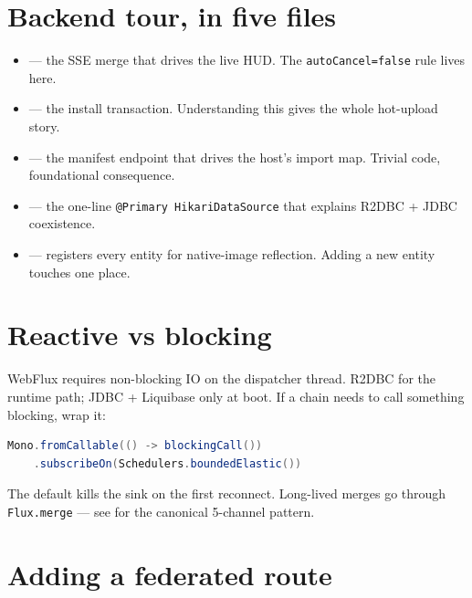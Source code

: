 \documentclass[11pt,a4paper,openany]{book}
\begin{document}
\chapter{Backend tour, in five files}
\begin{itemize}
  \item {} --- the SSE merge that drives
        the live HUD. The \texttt{autoCancel=false} rule lives here.
  \item {} --- the install transaction.
        Understanding this gives the whole hot-upload story.
  \item {} --- the manifest endpoint that
        drives the host's import map. Trivial code, foundational
        consequence.
  \item {} --- the one-line
        \texttt{@Primary HikariDataSource} that explains R2DBC + JDBC
        coexistence.
  \item {} --- registers every entity for
        native-image reflection. Adding a new entity touches one place.
\end{itemize}

\chapter{Reactive vs blocking}

WebFlux requires non-blocking IO on the dispatcher thread. R2DBC for
the runtime path; JDBC + Liquibase only at boot. If a chain needs to
call something blocking, wrap it:

\begin{lstlisting}[language=Java]
Mono.fromCallable(() -> blockingCall())
    .subscribeOn(Schedulers.boundedElastic())
\end{lstlisting}

\begin{snapcaution}[title={Sinks.many() must set autoCancel=false}]
The default kills the sink on the first reconnect. Long-lived merges
go through \texttt{Flux.merge} --- see
 for the canonical 5-channel pattern.
\end{snapcaution}

\chapter{Adding a federated route}
\end{document}
